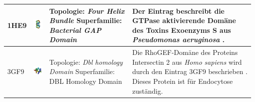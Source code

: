 \documentclass{article}
\begin{document}
\begin{table}
\begin{center}
\begin{tabular}{ | C{9mm} | C{30mm} | C{29mm} | C{38mm} | }
1HE9  & \includegraphics[width=30mm, trim= -10 -5 -5 -10]{1HE9_bio_r_500.jpg}  & Topologie: \newline \textit{Four Helix Bundle} \newline Superfamilie: \newline \textit{Bacterial GAP Domain}   & Der Eintrag beschreibt die GTPase aktivierende Dom\"ane des Toxins Exoenzyms S aus \textit{Pseudomonas aeruginosa} \cite{1he9}. \\ \hline
3GF9  & \includegraphics[width=30mm, trim= -10 -5 -5 -10]{3GF9_bio_r_500.jpg} & Topologie: \newline \textit{Dbl homology Domain} \newline Superfamilie: \newline DBL Homology Domain & Die RhoGEF-Dom\"ane des  Proteins Intersectin 2 aus \textit{Homo sapiens} wird durch den Eintrag 3GF9 beschrieben \cite{3gf9}. Dieses Protein ist f\"ur Endocytose zust\"andig. \\ 
\hline

\end{tabular}
\end{center}
\end{table}
\end{document}
